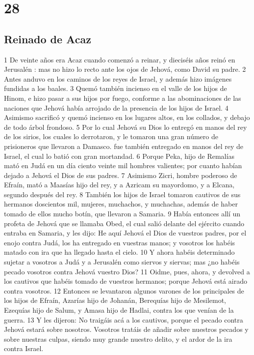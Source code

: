 \chapter{28}

\section*{Reinado de Acaz}

1 De veinte años era Acaz cuando comenzó a reinar, y dieciséis años reinó en Jerusalén : mas no hizo lo recto ante los ojos de Jehová, como David su padre.
2 Antes anduvo en los caminos de los reyes de Israel, y además hizo imágenes fundidas a los baales.
3 Quemó también incienso en el valle de los hijos de Hinom, e hizo pasar a sus hijos por fuego, conforme a las abominaciones de las naciones que Jehová había arrojado de la presencia de los hijos de Israel.
4 Asimismo sacrificó y quemó incienso en los lugares altos, en los collados, y debajo de todo árbol frondoso.
5 Por lo cual Jehová su Dios lo entregó en manos del rey de los sirios, los cuales lo derrotaron, y le tomaron una gran número de prisioneros que llevaron a Damasco. fue también entregado en manos del rey de Israel, el cual lo batió con gran mortandad.
6 Porque Peka, hijo de Remalías mató en Judá en un día ciento veinte mil hombres valientes; por cuanto habían dejado a Jehová el Dios de sus padres. 
7 Asimismo Zicri, hombre poderoso de Efraín, mató a Maasías hijo del rey, y a Azricam su mayordomo, y a Elcana, segundo después del rey.
8 También los hijos de Israel tomaron cautivos de sus hermanos doscientos mil, mujeres, muchachos, y muchachas, además de haber tomado de ellos mucho botín, que llevaron a Samaria.
9 Había entonces allí un profeta de Jehová que se llamaba Obed, el cual salió delante del ejército cuando entraba en Samaria, y les dijo: He aquí Jehová el Dios de vuestros padres, por el enojo contra Judá, los ha entregado en vuestras manos; y vosotros los habéis matado con ira que ha llegado hasta el cielo.
10 Y ahora habéis determinado sujetar a vosotros a Judá y a Jerusalén  como siervos y siervas; mas ¿no habéis pecado vosotros contra Jehová vuestro Dios?
11 Oidme, pues, ahora, y devolved a los cautivos que habéis tomado de vuestros hermanos; porque Jehová está airado contra vosotros.
12 Entonces se levantaron algunos varones de los principales de los hijos de Efraín, Azarías hijo de Johanán,  Berequías hijo de Mesilemot, Ezequías hijo de Salum, y Amasa hijo de Hadlai, contra los que venían de la guerra.
13 Y les dijeron: No traigáis acá a los cautivos, porque el pecado contra Jehová estará sobre nosotros. Vosotros tratáis de añadir sobre nuestros pecados y sobre nuestras culpas, siendo muy grande nuestro delito, y el ardor de la ira contra Israel.
